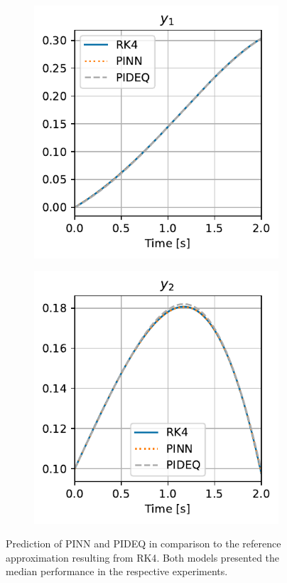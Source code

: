 \begin{figure}[h]
    \centering
    \begin{subfigure}[t]{.45\textwidth}
	\includegraphics{images/final_vdp_y1.pdf}
	\caption{}
    \end{subfigure}
    \begin{subfigure}[t]{.45\textwidth}
	\includegraphics{images/final_vdp_y2.pdf}
	\caption{}
    \end{subfigure}
    \caption[Prediction of \gls{PINN} and \gls{PIDEQ} in comparison to the reference approximation resulting from \gls{RK4}.]{Prediction of \gls{PINN} and \gls{PIDEQ} in comparison to the reference approximation resulting from \gls{RK4}. Both models presented the median performance in the respective experiments.}
    \label{fig:final-vdp}
\end{figure}

